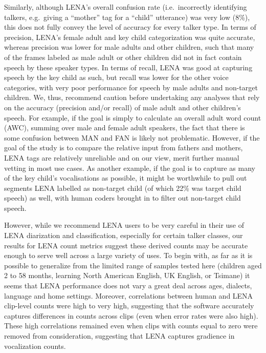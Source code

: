 \documentclass[english,floatsintext,man]{apa6}
\begin{document}
Similarly, although LENA's overall confusion rate (i.e.~incorrectly
identifying talkers, e.g.~giving a \enquote{mother} tag for a
\enquote{child} utterance) was very low (8\%), this does not fully
convey the level of accuracy for every talker type. In terms of
precision, LENA's female adult and key child categorization was quite
accurate, whereas precision was lower for male adults and other
children, such that many of the frames labeled as male adult or other
children did not in fact contain speech by these speaker types. In terms
of recall, LENA was good at capturing speech by the key child as such,
but recall was lower for the other voice categories, with very poor
performance for speech by male adults and non-target children. We, thus,
recommend caution before undertaking any analyses that rely on the
accuracy (precision and/or recall) of male adult and other children's
speech. For example, if the goal is simply to calculate an overall adult
word count (AWC), summing over male and female adult speakers, the fact
that there is some confusion between MAN and FAN is likely not
problematic. However, if the goal of the study is to compare the
relative input from fathers and mothers, LENA tags are relatively
unreliable and on our view, merit further manual vetting in most use
cases. As another example, if the goal is to capture as many of the key
child's vocalisations as possible, it might be worthwhile to pull out
segments LENA labelled as non-target child (of which 22\% was target
child speech) as well, with human coders brought in to filter out
non-target child speech.

However, while we recommend LENA users to be very careful in their use
of LENA diarization and classification, especially for certain talker
classes, our results for LENA count metrics suggest these derived counts
may be accurate enough to serve well across a large variety of uses. To
begin with, as far as it is possible to generalize from the limited
range of samples tested here (children aged 2 to 58 months, learning
North American English, UK English, or Tsimane) it seems that LENA
performance does not vary a great deal across ages, dialects, language
and home settings. Moreover, correlations between human and LENA
clip-level counts were high to very high, suggesting that the software
accurately captures differences in counts across clips (even when error
rates were also high). These high correlations remained even when clips
with counts equal to zero were removed from consideration, suggesting
that LENA captures gradience in vocalization counts.
\end{document}
